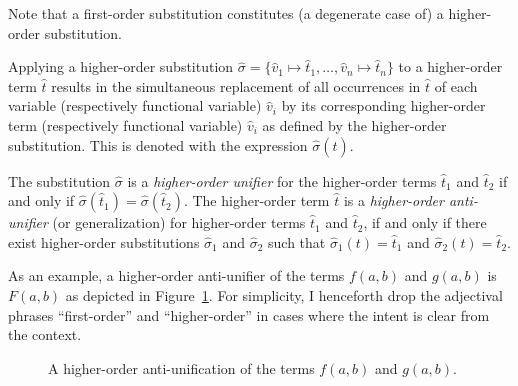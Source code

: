 Note that a first-order substitution constitutes (a degenerate case of) a higher-order substitution.

\begin{defn}\label{def:apply_HOsubstitution}
Applying a higher-order substitution $\hat{\sigma} = \{\hat{v}_1 \mapsto \hat{t}_1, \ldots, \hat{v}_n \mapsto \hat{t}_n\}$ to a higher-order term $\hat{t}$ results in the simultaneous replacement of all occurrences in $\hat{t}$ of each variable (respectively functional variable) $\hat{v}_i$ by its corresponding higher-order term (respectively functional variable) $\hat{v}_i$ as defined by the higher-order substitution. This is denoted with the expression $\hat{\sigma}(\hat{t})$.
\end{defn}

\begin{defn}\label{def:HOgeneralization}
The substitution $\hat{\sigma}$ is a \emph{higher-order unifier} for the higher-order terms $\hat{t}_1$ and $\hat{t}_2$ if and only if %
$\hat{\sigma}(\hat{t}_1)=\hat{\sigma}(\hat{t}_2)$.
The higher-order term $\hat{t}$ is a \emph{higher-order anti-unifier} (or generalization) for higher-order terms $\hat{t}_1$ and $\hat{t}_2$, if and only if there exist higher-order substitutions $\hat{\sigma}_1$ and $\hat{\sigma}_2$ such that $\hat{\sigma}_1(t)=\hat{t}_1$ and $\hat{\sigma}_2(t)=\hat{t}_2$.
\end{defn}

As an example, a higher-order anti-unifier of the terms $f(a,b)$ and $g(a,b)$ is $F(a,b)$ as depicted in Figure~\ref{fig:higher-anti-uni}.   For simplicity, I henceforth drop the adjectival phrases ``first-order'' and ``higher-order'' in cases where the intent is clear from the context.

\begin{figure}[t]
\centering{}
\caption{A higher-order anti-unification of the terms $f(a,b)$ and $g(a,b)$.\label{fig:higher-anti-uni}}
\end{figure}

